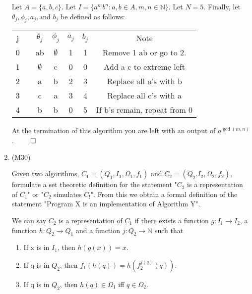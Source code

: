 \documentclass[Main.tex]{subfiles}
\begin{document}
\begin{enumerate}
        Let $A = \{a, b, c\}$. Let $I = \{ a^mb^n : a,b \in A, m,n\in\mathbb{N} \}$. Let $N = 5$. Finally, let $\theta_j, \phi_j, a_j, \text{and } b_j$ be defined as follows:
        \begin{center}
            \begin{tabular}{c c c c c c}
                j$\quad$ & $\theta_j$ & $\phi_j$ & $a_j$ & $b_j$ & Note\\
                0$\quad$   & ab             & $\emptyset$   & 1 & 1 & Remove 1 ab or go to 2.\\
                1$\quad$   & $\emptyset$    & c             & 0 & 0 & Add a c to extreme left\\
                2$\quad$   & a              & b             & 2 & 3 & Replace all a's with b\\
                3$\quad$   & c              & a             & 3 & 4 & Replace all c's with a\\
                4$\quad$   & b              & b             & 0 & 5 & If b's remain, repeat from 0
            \end{tabular} 
        \end{center}
        
        At the termination of this algorithm you are left with an output of $a^{\gcd(m,n)}$. $\hfill\qed$
    
    \item (M30)
    
        Given two algorithms, $C_1 = (Q_1, I_1, \Omega_1, f_1)$ and $C_2 = (Q_2. I_2, \Omega_2, f_2)$, formulate a set theoretic definition for the statement "$C_2$ is a representation of $C_1$" or "$C_2$ simulates $C_!$". From this we obtain a formal definition of the statement "Program X is an implementation of Algorithm Y".
        
        We can say $C_2$ is a representation of $C_1$ if there exists a function $g: I_1 \rightarrow I_2$, a function $h: Q_2 \rightarrow Q_1$ and a function $j: Q_2 \rightarrow\mathbb{N}$ such that
        \begin{enumerate}
            \item If x is in $I_1$, then $h(g(x)) = x$.
            \item If q is in $Q_2$, then $f_1(h(q)) = h(f_2^{j(q)}(q))$.
            \item If q is in $Q_2$, then $h(q)\in\Omega_1$ iff $q\in\Omega_2$.
        \end{enumerate}
    
\end{enumerate}
\end{document}
